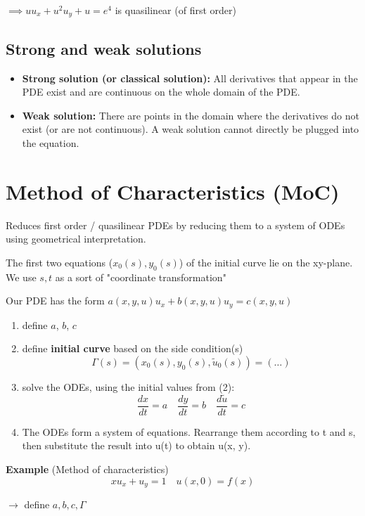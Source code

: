 $\implies uu_x + u^2u_y + u = e^4$ is quasilinear (of first order)

\subsection{Strong and weak solutions}
\begin{itemize}
    \item \textbf{Strong solution (or classical solution):} All derivatives that appear in the PDE exist and are continuous on the whole domain of the PDE.
    \item \textbf{Weak solution:} There are points in the domain where the derivatives do not exist (or are not continuous). A weak solution cannot directly be plugged into the equation.
\end{itemize}

\section{Method of Characteristics (MoC)}
Reduces first order / quasilinear PDEs by reducing them to a system of ODEs using geometrical interpretation.

The first two equations ($x_0(s),y_0(s)$) of the initial curve lie on the xy-plane. We use $s,t$ as a sort of "coordinate transformation"
\begin{recipe}
Our PDE has the form $a(x,y,u)u_x + b(x,y,u)u_y = c(x,y,u)$
\begin{enumerate}
 \item define $a$, $b$, $c$
 \item define \textbf{initial curve} based on the side condition(s)
 $$\varGamma(s) = (x_0(s), y_0(s), \tilde{u}_0(s)) = (\dots)$$
 \item solve the ODEs, using the initial values from (2):
 $$\frac{dx}{dt}=a \quad \frac{dy}{dt}=b \quad \frac{d\tilde{u}}{dt}=c$$
 \item The ODEs form a system of equations. Rearrange them according to t and s, then substitute the result into u(t) to obtain u(x, y).
\end{enumerate}
\end{recipe}


\textbf{Example} (Method of characteristics)
$$xu_x+u_y = 1 \quad u(x,0)=f(x)$$

$\to$ define $a,b,c,\varGamma$

